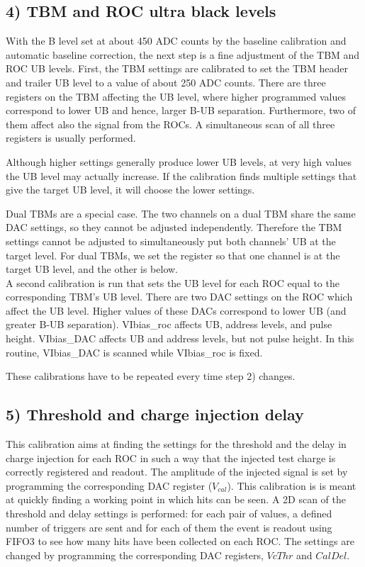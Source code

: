 \subsection*{4) TBM and ROC ultra black levels}

With the B level set at about 450 ADC counts by the baseline calibration and automatic baseline correction, the next step is a fine adjustment of the TBM and ROC UB levels.
First, the TBM settings are calibrated to set the TBM header and trailer UB level to a value of about 250 ADC counts.
There are three registers on the TBM affecting the UB level, where higher programmed values correspond to lower UB and hence, larger B-UB separation. Furthermore, two of them affect also the signal from the ROCs.
A simultaneous scan of all three registers is usually performed.

Although higher settings generally produce lower UB levels, at very high values the UB level may actually increase. If the calibration finds multiple settings that give the target UB level, it will choose the lower settings.

Dual TBMs are a special case. The two channels on a dual TBM share the same DAC settings, so they cannot be adjusted independently. Therefore the TBM settings cannot be adjusted to simultaneously put both channels' UB at the target level. For dual TBMs, we set the register so that one channel is at the target UB level, and the other is below.\\

A second calibration is run that sets the UB level for each ROC equal to the corresponding TBM's UB level.
There are two DAC settings on the ROC which affect the UB level. Higher values of these DACs correspond to lower UB (and greater B-UB separation). VIbias\_roc affects UB, address levels, and pulse height. VIbias\_DAC affects UB and address levels, but not pulse height. In this routine, VIbias\_DAC is scanned while VIbias\_roc is fixed.

These calibrations have to be repeated every time step 2) changes.

\subsection*{5) Threshold and charge injection delay}

This calibration aims at finding the settings for the threshold and the delay in charge injection for each ROC in such a way that the injected test charge is correctly registered and readout.
The amplitude of the injected signal is set by programming the corresponding DAC register ($V_{cal}$).
This calibration is is meant at quickly finding a working point in which hits can be seen.
A 2D scan of the threshold and delay settings is performed: for each pair of values, a defined number of triggers are sent and for each of them the event is readout using FIFO3 to see how many hits have been collected on each ROC.
The settings are changed by programming the corresponding DAC registers, $VcThr$ and $CalDel$.


